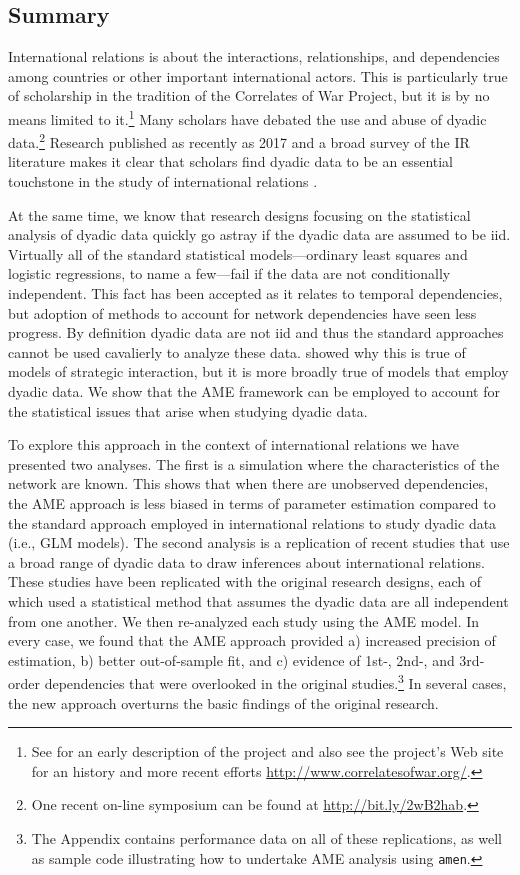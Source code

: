 \subsection*{Summary}
International relations is about the interactions, relationships, and dependencies among countries or other important international actors. This is particularly true of scholarship in the tradition of the Correlates of War Project, but it is by no means limited to it.\footnote{See \cite{singer:1972} for an early description of the project and also see the project's Web site for an history and more recent efforts \url{http://www.correlatesofwar.org/}.} Many scholars have debated the use and abuse of dyadic data.\footnote{One recent on-line symposium can be found at \url{http://bit.ly/2wB2hab}.} Research published as recently as 2017 and a broad survey of the IR literature makes it clear that scholars find dyadic data to be an essential touchstone in the study of international relations \citep{erikson:pinto:2014,aronow:etal:2015}.

At the same time, we know that research designs focusing on the statistical analysis of dyadic data quickly go astray if the dyadic data are assumed to be iid.  Virtually all of the standard statistical models---ordinary least squares and logistic regressions, to name a few---fail if the data are not conditionally independent. This fact has been accepted as it relates to temporal dependencies, but adoption of methods to account for network dependencies have seen less progress. By definition dyadic data are not iid and thus the standard approaches cannot be used cavalierly to analyze these data.  \citet{signorino:1999} showed why this is true of models of strategic interaction, but it is more broadly true of models that employ dyadic data.  We show that the AME framework can be employed to account for the statistical issues that arise when studying dyadic data.

To explore this approach in the context of international relations we have presented two analyses. The first is a simulation where the characteristics of the network are known. This shows that when there are unobserved dependencies, the AME approach is less biased in terms of parameter estimation compared to the standard approach employed in international relations to study dyadic data (i.e., GLM models). The second analysis is a replication of recent studies that use a broad range of dyadic data to draw inferences about international relations.  These studies have been replicated with the original research designs, each of which used a statistical method that assumes the dyadic data are all independent from one another.  We then re-analyzed each study using the AME model.  In every case, we found that the AME approach provided a) increased precision of estimation, b) better out-of-sample fit, and c) evidence of 1st-, 2nd-, and 3rd-order dependencies that were overlooked in the original studies.\footnote{The Appendix contains performance data on all of these replications, as well as sample code illustrating how to undertake AME analysis using \texttt{amen}.} In several cases, the new approach overturns the basic findings of the original research.


